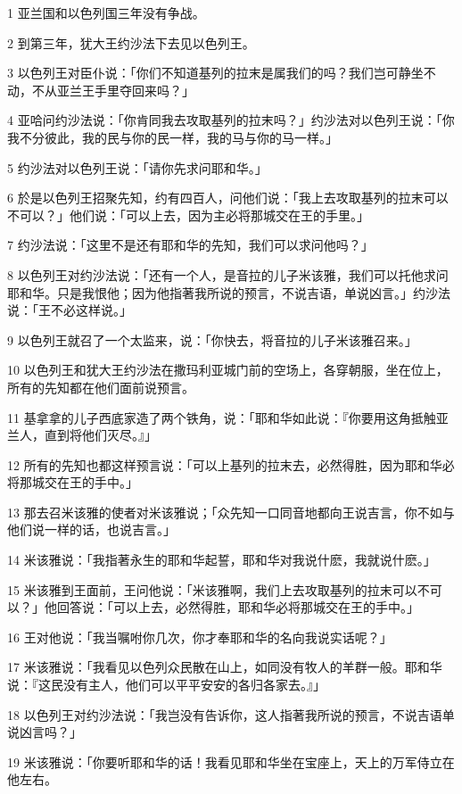 \par 1 亚兰国和以色列国三年没有争战。
\par 2 到第三年，犹大王约沙法下去见以色列王。
\par 3 以色列王对臣仆说：「你们不知道基列的拉末是属我们的吗？我们岂可静坐不动，不从亚兰王手里夺回来吗？」
\par 4 亚哈问约沙法说：「你肯同我去攻取基列的拉末吗？」约沙法对以色列王说：「你我不分彼此，我的民与你的民一样，我的马与你的马一样。」
\par 5 约沙法对以色列王说：「请你先求问耶和华。」
\par 6 於是以色列王招聚先知，约有四百人，问他们说：「我上去攻取基列的拉末可以不可以？」他们说：「可以上去，因为主必将那城交在王的手里。」
\par 7 约沙法说：「这里不是还有耶和华的先知，我们可以求问他吗？」
\par 8 以色列王对约沙法说：「还有一个人，是音拉的儿子米该雅，我们可以托他求问耶和华。只是我恨他；因为他指著我所说的预言，不说吉语，单说凶言。」约沙法说：「王不必这样说。」
\par 9 以色列王就召了一个太监来，说：「你快去，将音拉的儿子米该雅召来。」
\par 10 以色列王和犹大王约沙法在撒玛利亚城门前的空场上，各穿朝服，坐在位上，所有的先知都在他们面前说预言。
\par 11 基拿拿的儿子西底家造了两个铁角，说：「耶和华如此说：『你要用这角抵触亚兰人，直到将他们灭尽。』」
\par 12 所有的先知也都这样预言说：「可以上基列的拉末去，必然得胜，因为耶和华必将那城交在王的手中。」
\par 13 那去召米该雅的使者对米该雅说；「众先知一口同音地都向王说吉言，你不如与他们说一样的话，也说吉言。」
\par 14 米该雅说：「我指著永生的耶和华起誓，耶和华对我说什麽，我就说什麽。」
\par 15 米该雅到王面前，王问他说：「米该雅啊，我们上去攻取基列的拉末可以不可以？」他回答说：「可以上去，必然得胜，耶和华必将那城交在王的手中。」
\par 16 王对他说：「我当嘱咐你几次，你才奉耶和华的名向我说实话呢？」
\par 17 米该雅说：「我看见以色列众民散在山上，如同没有牧人的羊群一般。耶和华说：『这民没有主人，他们可以平平安安的各归各家去。』」
\par 18 以色列王对约沙法说：「我岂没有告诉你，这人指著我所说的预言，不说吉语单说凶言吗？」
\par 19 米该雅说：「你要听耶和华的话！我看见耶和华坐在宝座上，天上的万军侍立在他左右。
